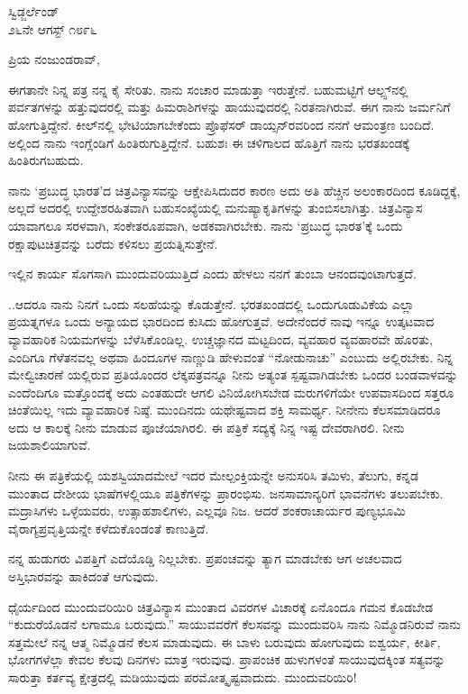 \begin{flushright}
ಸ್ವಿಡ್ಜರ್ಲೆಂಡ್\\೨೬ನೇ ಆಗಸ್ಟ್ ೧೮೯೬
\end{flushright}

\noindent
ಪ್ರಿಯ ನಂಜುಂಡರಾವ್,

ಈಗತಾನೇ ನಿನ್ನ ಪತ್ರ ನನ್ನ ಕೈ ಸೇರಿತು. ನಾನು ಸಂಚಾರ ಮಾಡುತ್ತಾ ಇರುತ್ತೇನೆ. ಬಹುಮಟ್ಟಿಗೆ ಆಲ್ಪ್ಸ್‌ನಲ್ಲಿ ಪರ್ವತಗಳನ್ನು ಹತ್ತುವುದರಲ್ಲಿ ಮತ್ತು ಹಿಮರಾಶಿಗಳನ್ನು ಹಾಯುವುದರಲ್ಲಿ ನಿರತನಾಗಿರುವೆ. ಈಗ ನಾನು ಜರ್ಮನಿಗೆ ಹೋಗುತ್ತಿದ್ದೇನೆ. ಕೀಲ್‌ನಲ್ಲಿ ಭೇಟಿಯಾಗಬೇಕೆಂದು ಪ್ರೊಫೆಸರ್ ಡಾಯ್ಸನ್‌ರವರಿಂದ ನನಗೆ ಆಮಂತ್ರಣ ಬಂದಿದೆ. ಅಲ್ಲಿಂದ ನಾನು ಇಂಗ್ಲೆಂಡಿಗೆ ಹಿಂತಿರುಗುತ್ತಿದ್ದೇನೆ. ಬಹುಶಃ ಈ ಚಳಿಗಾಲದ ಹೊತ್ತಿಗೆ ನಾನು ಭರತಖಂಡಕ್ಕೆ ಹಿಂತಿರುಗಬಹುದು.

ನಾನು `ಪ್ರಬುದ್ಧ ಭಾರತ'ದ ಚಿತ್ರವಿನ್ಯಾಸವನ್ನು ಆಕ್ಷೇಪಿಸಿದುದರ ಕಾರಣ ಅದು ಅತಿ ಹೆಚ್ಚಿನ ಅಲಂಕಾರದಿಂದ ಕೂಡಿದ್ದಕ್ಕೆ, ಅಲ್ಲದೆ ಅದರಲ್ಲಿ ಉದ್ದೇಶರಹಿತವಾಗಿ ಬಹುಸಂಖ್ಯೆಯಲ್ಲಿ ಮನುಷ್ಯಾಕೃತಿಗಳನ್ನು ತುಂಬಿಸಲಾಗಿತ್ತು. ಚಿತ್ರವಿನ್ಯಾಸ ಯಾವಾಗಲೂ ಸರಳವಾಗಿ, ಸಂಕೇತರೂಪವಾಗಿ, ಅಡಕವಾಗಿರಬೇಕು. ನಾನು `ಪ್ರಬುದ್ಧ ಭಾರತ'ಕ್ಕೆ ಒಂದು ರಕ್ಷಾಪುಟಚಿತ್ರವನ್ನು ಬರೆದು ಕಳಿಸಲು ಪ್ರಯತ್ನಿಸುತ್ತೇನೆ.

ಇಲ್ಲಿನ ಕಾರ್ಯ ಸೊಗಸಾಗಿ ಮುಂದುವರಿಯುತ್ತಿದೆ ಎಂದು ಹೇಳಲು ನನಗೆ ತುಂಬಾ ಆನಂದವುಂಟಾಗುತ್ತದೆ.

..ಆದರೂ ನಾನು ನಿನಗೆ ಒಂದು ಸಲಹೆಯನ್ನು ಕೊಡುತ್ತೇನೆ. ಭರತಖಂಡದಲ್ಲಿ ಒಂದುಗೂಡುವಿಕೆಯ ಎಲ್ಲಾ ಪ್ರಯತ್ನಗಳೂ ಒಂದು ಅನ್ಯಾಯದ ಭಾರದಿಂದ ಕುಸಿದು ಹೋಗುತ್ತವೆ. ಅದೇನೆಂದರೆ ನಾವು ಇನ್ನೂ ಉತ್ಕಟವಾದ ವ್ಯಾವಹಾರಿಕ ನಿಯಮಗಳನ್ನು ಬೆಳೆಸಿಕೊಂಡಿಲ್ಲ. ಉಚ್ಚಜ್ಞಾನದ ಮಟ್ಟದಿಂದ, ವ್ಯವಹಾರ ವ್ಯವಹಾರವೇ ಹೊರತು, ಎಂದಿಗೂ ಗೆಳೆತನವಲ್ಲ\enginline{-} ಅಥವಾ ಹಿಂದೂಗಳ ನಾಣ್ಣುಡಿ ಹೇಳುವಂತೆ “ನೋಡು\enginline{-}ನಾಚು” ಎಂಬುದು ಅಲ್ಲಿರಬೇಕು. ನಿನ್ನ ಮೇಲ್ವಿಚಾರಣೆ ಯಲ್ಲಿರುವ ಪ್ರತಿಯೊಂದರ ಲೆಕ್ಕಪತ್ರವನ್ನೂ ನೀನು ಅತ್ಯಂತ ಸ್ಪಷ್ಟವಾಗಿಡಬೇಕು\enginline{-} ಒಂದರ ಬಂಡವಾಳವನ್ನು ಎಂದೆಂದಿಗೂ ಮತ್ತೊಂದಕ್ಕೆ ಅದು ಎಂತಹುದೇ ಆಗಲಿ ವಿನಿಯೋಗಿಸಬೇಡ \enginline{-} ಮರುಗಳಿಗೆಯೇ ಉಪವಾಸದಿಂದ ಸತ್ತರೂ ಚಿಂತೆಯಿಲ್ಲ\enginline{-} ಇದು ವ್ಯಾವಹಾರಿಕ ನಿಷ್ಠೆ. ಮುಂದಿನದು ಯಥೇಷ್ಟವಾದ ಶಕ್ತಿ ಸಾಮರ್ಥ್ಯ. ನೀನೇನು ಕೆಲಸಮಾಡಿದರೂ ಅದು ಆ ಕಾಲಕ್ಕೆ ನೀನು ಮಾಡುವ ಪೂಜೆಯಾಗಿರಲಿ. ಈ ಪತ್ರಿಕೆ ಸದ್ಯಕ್ಕೆ ನಿನ್ನ ಇಷ್ಟ ದೇವರಾಗಿರಲಿ. ನೀನು ಜಯಶಾಲಿಯಾಗುವೆ.

ನೀನು ಈ ಪತ್ರಿಕೆಯಲ್ಲಿ ಯಶಸ್ವಿಯಾದಮೇಲೆ ಇದರ ಮೇಲ್ಪಂಕ್ತಿಯನ್ನೇ ಅನುಸರಿಸಿ ತಮಿಳು, ತೆಲುಗು, ಕನ್ನಡ ಮುಂತಾದ ದೇಶೀಯ ಭಾಷೆಗಳಲ್ಲಿಯೂ ಪತ್ರಿಕೆಗಳನ್ನು ಪ್ರಾರಂಭಿಸು. ಜನಸಾಮಾನ್ಯರಿಗೆ ಭಾವನೆಗಳು ತಲುಪಬೇಕು. ಮದ್ರಾಸಿಗಳು ಒಳ್ಳೆಯವರು, ಉತ್ಸಾಹಶಾಲಿಗಳು, ಎಲ್ಲವೂ ನಿಜ. ಆದರೆ ಶಂಕರಾಚಾರ್ಯರ ಪುಣ್ಯಭೂಮಿ ವೈರಾಗ್ಯಪ್ರವೃತ್ತಿಯನ್ನೇ ಕಳೆದುಕೊಂಡಂತೆ ಕಾಣುತ್ತಿದೆ.

ನನ್ನ ಹುಡುಗರು ವಿಪತ್ತಿಗೆ ಎದೆಯೊಡ್ಡಿ ನಿಲ್ಲಬೇಕು. ಪ್ರಪಂಚವನ್ನು ತ್ಯಾಗ ಮಾಡಬೇಕು\enginline{-} ಆಗ ಅಚಲವಾದ ಅಸ್ತಿಭಾರವನ್ನು ಹಾಕಿದಂತೆ ಆಗುವುದು.

ಧೈರ್ಯದಿಂದ ಮುಂದುವರಿಯಿರಿ\enginline{-} ಚಿತ್ರವಿನ್ಯಾಸ ಮುಂತಾದ ವಿವರಗಳ ವಿಚಾರಕ್ಕೆ ಏನೊಂದೂ ಗಮನ ಕೊಡಬೇಡ\enginline{-} “ಕುದುರೆಯೊಡನೆ ಲಗಾಮೂ ಬರುವುದು.” ಸಾಯುವವರೆಗೆ ಕೆಲಸವನ್ನು ಮುಂದುವರಿಸಿ\enginline{-} ನಾನು ನಿಮ್ಮೊಡನಿರುವೆ\enginline{-} ನಾನು ಸತ್ತಮೇಲೆ ನನ್ನ ಆತ್ಮ ನಿಮ್ಮೊಡನೆ ಕೆಲಸ ಮಾಡುವುದು. ಈ ಬಾಳು ಬರುವುದು ಹೋಗುವುದು\enginline{-} ಐಶ್ವರ್ಯ, ಕೀರ್ತಿ, ಭೋಗಗಳೆಲ್ಲಾ ಕೇವಲ ಕೆಲವು ದಿನಗಳು ಮಾತ್ರ ಇರುವುವು. ಪ್ರಾಪಂಚಿಕ ಹುಳುಗಳಂತೆ ಸಾಯುವುದಕ್ಕಿಂತ ಸತ್ಯವನ್ನು ಸಾರುತ್ತಾ ಕರ್ತವ್ಯ ಕ್ಷೇತ್ರದಲ್ಲಿ ಮಡಿಯುವುದು ಪರಮೋತ್ಕೃಷ್ಟವಾದುದು. ಮುಂದುವರಿಯಿರಿ!

